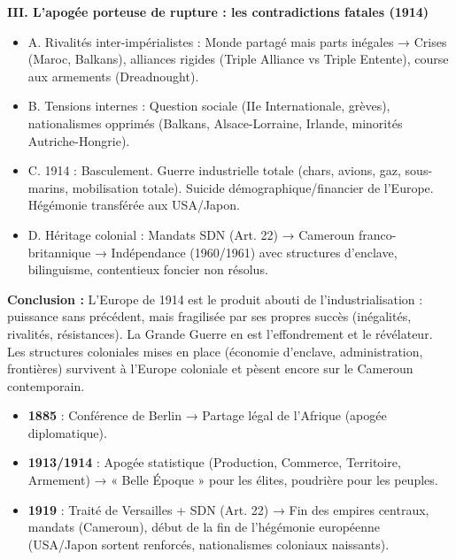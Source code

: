 \documentclass[11pt]{article}
\begin{document}
\begin{exoresolu}
\textbf{III. L'apogée porteuse de rupture : les contradictions fatales (1914)}
\begin{itemize}
    \item A. Rivalités inter-impérialistes : Monde partagé mais parts inégales → Crises (Maroc, Balkans), alliances rigides (Triple Alliance vs Triple Entente), course aux armements (Dreadnought).
    \item B. Tensions internes : Question sociale (IIe Internationale, grèves), nationalismes opprimés (Balkans, Alsace-Lorraine, Irlande, minorités Autriche-Hongrie).
    \item C. 1914 : Basculement. Guerre industrielle totale (chars, avions, gaz, sous-marins, mobilisation totale). Suicide démographique/financier de l'Europe. Hégémonie transférée aux USA/Japon.
    \item D. Héritage colonial : Mandats SDN (Art. 22) → Cameroun franco-britannique → Indépendance (1960/1961) avec structures d'enclave, bilinguisme, contentieux foncier non résolus.
\end{itemize}

\textbf{Conclusion :} L'Europe de 1914 est le produit abouti de l'industrialisation : puissance sans précédent, mais fragilisée par ses propres succès (inégalités, rivalités, résistances). La Grande Guerre en est l'effondrement et le révélateur. Les structures coloniales mises en place (économie d'enclave, administration, frontières) survivent à l'Europe coloniale et pèsent encore sur le Cameroun contemporain.
\end{exoresolu}

\begin{aretenir}
\begin{itemize}
    \item \textbf{1885} : Conférence de Berlin → Partage légal de l'Afrique (apogée diplomatique).
    \item \textbf{1913/1914} : Apogée statistique (Production, Commerce, Territoire, Armement) → « Belle Époque » pour les élites, poudrière pour les peuples.
    \item \textbf{1919} : Traité de Versailles + SDN (Art. 22) → Fin des empires centraux, mandats (Cameroun), début de la fin de l'hégémonie européenne (USA/Japon sortent renforcés, nationalismes coloniaux naissants).
\end{itemize}
\end{aretenir}

\newpage
\end{document}

